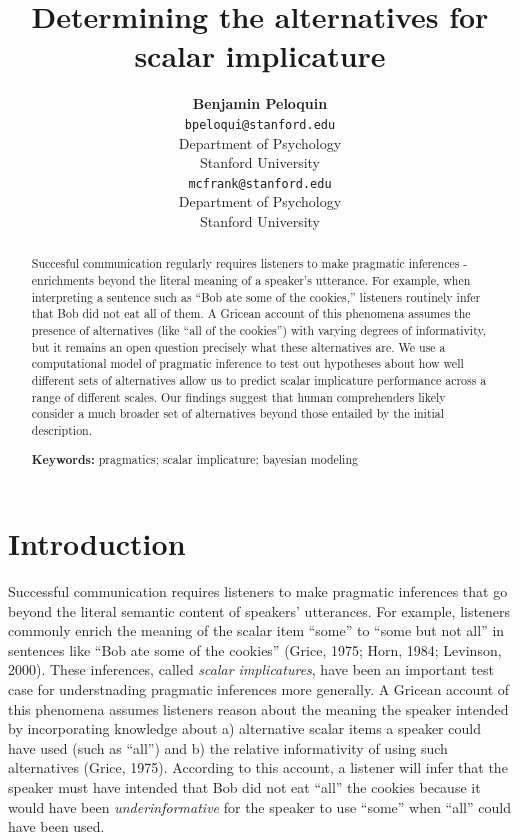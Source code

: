 \documentclass[10pt, letterpaper]{article}
\title{Determining the alternatives for scalar implicature}
\author{{\large \bf Benjamin Peloquin} \\ \texttt{bpeloqui@stanford.edu} \\ Department of Psychology \\ Stanford University \And {\large \bf Michael C. Frank} \\ \texttt{mcfrank@stanford.edu} \\ Department of Psychology \\ Stanford University}
\begin{document}
\maketitle

\begin{abstract}
Succesful communication regularly requires listeners to make pragmatic
inferences - enrichments beyond the literal meaning of a speaker's
utterance. For example, when interpreting a sentence such as ``Bob ate
some of the cookies,'' listeners routinely infer that Bob did not eat
all of them. A Gricean account of this phenomena assumes the presence of
alternatives (like ``all of the cookies'') with varying degrees of
informativity, but it remains an open question precisely what these
alternatives are. We use a computational model of pragmatic inference to
test out hypotheses about how well different sets of alternatives allow
us to predict scalar implicature performance across a range of different
scales. Our findings suggest that human comprehenders likely consider a
much broader set of alternatives beyond those entailed by the initial
description.

\textbf{Keywords:}
pragmatics; scalar implicature; bayesian modeling
\end{abstract}

\section{Introduction}\label{introduction}

Successful communication requires listeners to make pragmatic inferences
that go beyond the literal semantic content of speakers' utterances. For
example, listeners commonly enrich the meaning of the scalar item
``some'' to ``some but not all'' in sentences like ``Bob ate some of the
cookies'' (Grice, 1975; Horn, 1984; Levinson, 2000). These inferences,
called \emph{scalar implicatures}, have been an important test case for
understnading pragmatic inferences more generally. A Gricean account of
this phenomena assumes listeners reason about the meaning the speaker
intended by incorporating knowledge about a) alternative scalar items a
speaker could have used (such as ``all'') and b) the relative
informativity of using such alternatives (Grice, 1975). According to
this account, a listener will infer that the speaker must have intended
that Bob did not eat ``all'' the cookies because it would have been
\emph{underinformative} for the speaker to use ``some'' when ``all''
could have been used.
\end{document}
